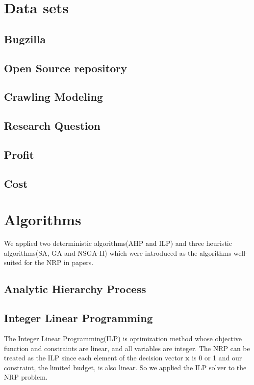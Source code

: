 \section{Data sets}

\subsection{Bugzilla}
\subsection{Open Source repository}
\subsection{Crawling Modeling}
\subsection{Research Question}
\subsection{Profit}
\subsection{Cost}

\section{Algorithms}
We applied two deterministic algorithms(AHP and ILP) and three heuristic algorithms(SA, GA and NSGA-II) which were introduced as the algorithms well-suited for the NRP in papers.\cite{NRP}\cite{ILP}\cite{IGA}\cite{MONRP}


\subsection{Analytic Hierarchy Process}

\subsection{Integer Linear Programming}
The Integer Linear Programming(ILP) is optimization method whose objective function and constraints are linear, and all variables are integer. The NRP can be treated as the ILP since each element of the decision vector $\textbf{x}$ is 0 or 1 and our constraint, the limited budget, is also linear. So we applied the ILP solver to the NRP problem.

